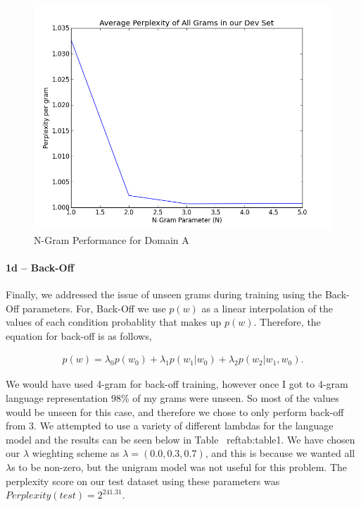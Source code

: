 \documentclass[paper=a4, fontsize=11pt]{scrartcl} %
\begin{document}
\begin{figure}
\centering
\includegraphics[scale=0.4]{figure_2.png}
\caption{N-Gram Performance for Domain A}
\label{fig:figure2}
\end{figure}

\paragraph{1d -- Back-Off}
Finally, we addressed the issue of unseen grams during training using the Back-Off parameters.  For, Back-Off we use $p(w)$ as a linear interpolation of the values of each condition probablity that makes up $p(w)$.  Therefore, the equation for back-off is as follows,

\begin{align}
p(w)=\lambda_0p(w_0) + \lambda_1p(w_1|w_0) + \lambda_2p(w_2|w_1,w_0).
\end{align}

We would have used 4-gram for back-off training, however once I got to 4-gram language representation 98\% of my grams were unseen.  
So most of the values would be unseen for this case, and therefore we chose to only perform back-off from 3.
We attempted to use a variety of different lambdas for the language model and the results can be seen below in Table ~ref{tab:table1}.  We have chosen our $\lambda$ wieghting scheme as $\lambda=(0.0,0.3,0.7)$, and this is because we wanted all $\lambda$s to be non-zero, but the unigram model was not useful for this problem. The perplexity score on our test dataset using these parameters was $Perplexity(test) = 2^{241.31}$.  
\end{document}
